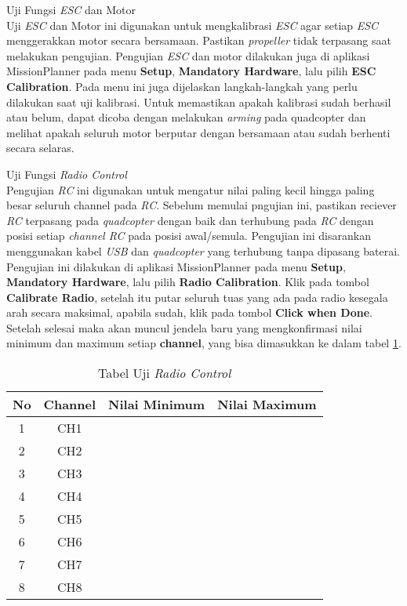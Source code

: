 \begin{packed_item}
\begin{packed_item}
		\item [c.] Uji Fungsi \textit{ESC} dan Motor
		\\ Uji \textit{ESC} dan Motor ini digunakan untuk mengkalibrasi \textit{ESC} agar setiap \textit{ESC} menggerakkan motor secara bersamaan. Pastikan \textit{propeller} tidak terpasang saat melakukan pengujian. 
		Pengujian \textit{ESC} dan motor dilakukan juga di aplikasi MissionPlanner pada menu \textbf{Setup}, \textbf{Mandatory Hardware}, lalu pilih \textbf{ESC Calibration}. Pada menu ini juga dijelaskan langkah-langkah yang perlu dilakukan saat uji kalibrasi.
		Untuk memastikan apakah kalibrasi sudah berhasil atau belum, dapat dicoba dengan melakukan \textit{arming} pada quadcopter dan melihat apakah seluruh motor berputar dengan bersamaan atau sudah berhenti secara selaras.
		
		\item [d.]  Uji Fungsi \textit{Radio Control}
		\\ Pengujian \textit{RC} ini digunakan untuk mengatur nilai paling kecil hingga paling besar seluruh channel pada \textit{RC}. Sebelum memulai pngujian ini, pastikan reciever \textit{RC} terpasang pada \textit{quadcopter} dengan baik dan terhubung pada \textit{RC} dengan posisi setiap \textit{channel RC} pada posisi awal/semula. Pengujian ini disarankan menggunakan kabel  \textit{USB} dan \textit{quadcopter} yang terhubung tanpa dipasang baterai.
		Pengujian ini dilakukan di aplikasi MissionPlanner pada menu \textbf{Setup}, \textbf{Mandatory Hardware}, lalu pilih \textbf{Radio Calibration}. Klik pada tombol \textbf{Calibrate Radio}, setelah itu putar seluruh tuas yang ada pada radio kesegala arah secara maksimal, apabila sudah, klik pada tombol \textbf{Click when Done}. Setelah selesai maka akan muncul jendela baru yang mengkonfirmasi nilai minimum dan maximum setiap \textbf{channel}, yang bisa dimasukkan ke dalam tabel \cref{tab:radio}.
		\begin{table}[h]
			\caption{Tabel Uji \textit{Radio Control}}
			\label{tab:radio}
			\centering
			\begin{tabular}{|c|c|c|c|}
				\hline
				\textbf{No} & \textbf{Channel}   & \textbf{Nilai Minimum} & \textbf{Nilai Maximum} \\ \hline
				1  & CH1     & &            \\ \hline
				2  & CH2     & &           \\ \hline
				3  & CH3     & &           \\ \hline
				4  & CH4     & &           \\ \hline
				5  & CH5 	 & &           \\ \hline
				6  & CH6     & &           \\ \hline
				7  & CH7     & &           \\ \hline
				8  & CH8     & &           \\ \hline
			\end{tabular}
		\end{table}
		

\end{packed_item}
\end{packed_item}
